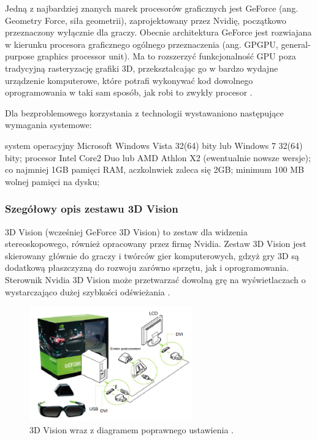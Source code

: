Jedną z najbardziej znanych marek procesorów graficznych jest GeForce (ang. Geometry Force, siła geometrii), zaprojektowany przez Nvidię, początkowo przeznaczony wyłącznie dla graczy. Obecnie architektura GeForce jest rozwiajana w kierunku procesora graficznego ogólnego przeznaczenia (ang. GPGPU, general-purpose graphics processor unit). Ma to rozszerzyć funkcjonalność GPU poza tradycyjną rasteryzację grafiki 3D, przekształcając go w bardzo wydajne urządzenie komputerowe, które potrafi wykonywać kod dowolnego oprogramowania w taki sam sposób, jak robi to zwykły procesor \cite{GeForce}. 

Dla bezproblemowego korzystania z technologii wystawaniono następujące wymagania systemowe: 
\begin{itemize}
\itemi system operacyjny Microsoft Windows Vista 32(64) bity lub Windows 7 32(64) bity;
\itemi procesor  Intel Core2 Duo lub AMD Athlon X2 (ewentualnie nowsze wersje);
\itemi co najmniej 1GB pamięci RAM, aczkolnwiek zaleca się 2GB;
\itemi minimum 100 MB wolnej pamięci na dysku;
\end{itemize}

\subsubsection{Szegółowy opis zestawu 3D Vision}
3D Vision (wcześniej GeForce 3D Vision) to zestaw dla widzenia stereoskopowego, również opracowany przez firmę Nvidia. Zestaw 3D Vision jest skierowany głównie do graczy i twórców gier komputerowych, gdzyż gry 3D są dodatkową płaszczyzną do rozwoju zarówno sprzętu, jak i oprogramowania. Sterownik Nvidia 3D Vision może przetwarzać dowolną grę na wyświetlaczach o wystarczająco dużej szybkości odświeżania \cite{NvidiaInfo}. 

\begin{figure}[H]
		\centering
 		\includegraphics[width=7cm]{3dVision.png}
    	\caption{3D Vision wraz z diagramem poprawnego ustawienia \cite{3dVisionPic}.}
 		\label{rys29}
\end{figure}

